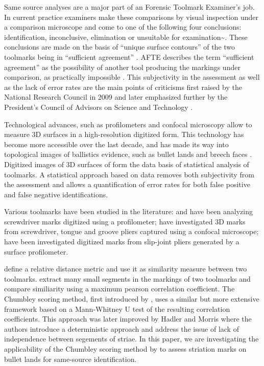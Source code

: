 \documentclass[12pt]{article}
\begin{document}
Same source analyses are a major part of an Forensic Toolmark Examiner's
job. In current practice examiners make these comparisons by visual
inspection under a comparison microscope and come to one of the
following four conclusions: identification, inconclusive, elimination or
unsuitable for examination\textasciitilde{}\citep{afte-toolmarks1998}.
These conclusions are made on the basis of ``unique surface contours''
of the two toolmarks being in ``sufficient agreement''
\citep{afte-toolmarks1998}. AFTE describes the term ``sufficient
agreement'' as the possibility of another tool producing the markings
under comparison, as practically impossible \citep{afte-toolmarks1998}.
This subjectivity in the assessment as well as the lack of error rates
are the main points of criticisms first raised by the National Research
Council in 2009 \citep{NAS:2009} and later emphasized further by the
President's Council of Advisors on Science and Technology
\citep{pcast2016}.

Technological advances, such as profilometers and confocal microscopy
allow to measure 3D surfaces in a high-resolution digitized form. This
technology has become more accessible over the last decade, and has made
its way into topological images of ballistics evidence, such as bullet
lands and breech faces
\citep{DeKinder1, DeKinder2, Bachrach1, vorburger2016}. Digitized images
of 3D surfaces of form the data basis of statistical analysis of
toolmarks. A statistical approach based on data removes both
subjectivity from the assessment and allows a quantification of error
rates for both false positive and false negative identifications.

Various toolmarks have been studied in the literature:
\citet{manytoolmarks1} and \citet{chumbley} have been analyzing
screwdriver marks digitized using a profilometer; \citet{manytoolmarks2}
have investigated 3D marks from screwdriver, tongue and groove pliers
captured using a confocal microscope; \citet{afte-chumbley} have been
investigated digitized marks from slip-joint pliers generated by a
surface profilometer.

\citet{manytoolmarks2} define a relative distance metric and use it as
similarity measure between two toolmarks. \citet{manytoolmarks1} extract
many small segments in the markings of two toolmarks and compare
similiarity using a maximum pearson correlation coefficient. The
Chumbley scoring method, first introduced by \citet{chumbley}, uses a
similar but more extensive framework based on a Mann-Whitney U test of
the resulting correlation coefficients. This approach was later improved
by Hadler and Morris \citep{hadler} where the authors introduce a
deterministic approach and address the issue of lack of independence
between segements of striae. In this paper, we are investigating the
applicability of the Chumbley scoring method by \citet{hadler} to assess
striation marks on bullet lands for same-source identification.
\end{document}
